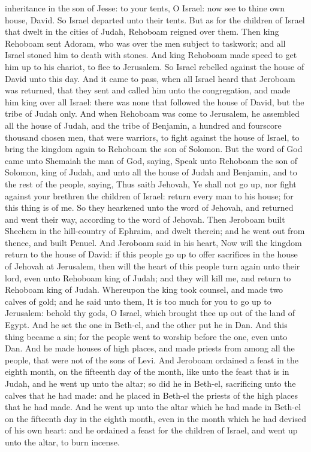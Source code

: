 inheritance in the son of Jesse: to your tents, O Israel: now see to thine own house, David. So Israel departed unto their tents. But as for the children of Israel that dwelt in the cities of Judah, Rehoboam reigned over them. Then king Rehoboam sent Adoram, who was over the men subject to taskwork; and all Israel stoned him to death with stones. And king Rehoboam made speed to get him up to his chariot, to flee to Jerusalem. So Israel rebelled against the house of David unto this day. And it came to pass, when all Israel heard that Jeroboam was returned, that they sent and called him unto the congregation, and made him king over all Israel: there was none that followed the house of David, but the tribe of Judah only.  And when Rehoboam was come to Jerusalem, he assembled all the house of Judah, and the tribe of Benjamin, a hundred and fourscore thousand chosen men, that were warriors, to fight against the house of Israel, to bring the kingdom again to Rehoboam the son of Solomon. But the word of God came unto Shemaiah the man of God, saying, Speak unto Rehoboam the son of Solomon, king of Judah, and unto all the house of Judah and Benjamin, and to the rest of the people, saying, Thus saith Jehovah, Ye shall not go up, nor fight against your brethren the children of Israel: return every man to his house; for this thing is of me. So they hearkened unto the word of Jehovah, and returned and went their way, according to the word of Jehovah.  Then Jeroboam built Shechem in the hill-country of Ephraim, and dwelt therein; and he went out from thence, and built Penuel. And Jeroboam said in his heart, Now will the kingdom return to the house of David: if this people go up to offer sacrifices in the house of Jehovah at Jerusalem, then will the heart of this people turn again unto their lord, even unto Rehoboam king of Judah; and they will kill me, and return to Rehoboam king of Judah. Whereupon the king took counsel, and made two calves of gold; and he said unto them, It is too much for you to go up to Jerusalem: behold thy gods, O Israel, which brought thee up out of the land of Egypt. And he set the one in Beth-el, and the other put he in Dan. And this thing became a sin; for the people went to worship before the one, even unto Dan. And he made houses of high places, and made priests from among all the people, that were not of the sons of Levi. And Jeroboam ordained a feast in the eighth month, on the fifteenth day of the month, like unto the feast that is in Judah, and he went up unto the altar; so did he in Beth-el, sacrificing unto the calves that he had made: and he placed in Beth-el the priests of the high places that he had made. And he went up unto the altar which he had made in Beth-el on the fifteenth day in the eighth month, even in the month which he had devised of his own heart: and he ordained a feast for the children of Israel, and went up unto the altar, to burn incense. 


